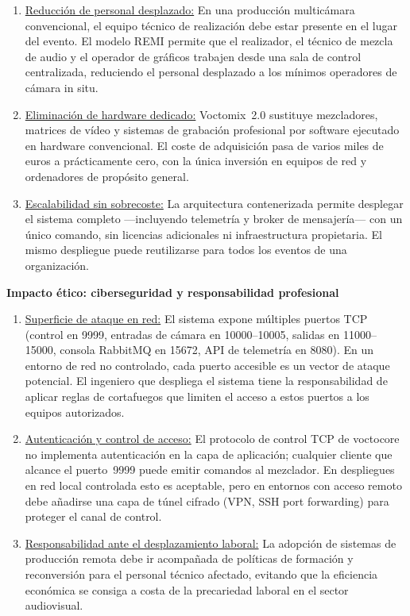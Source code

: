 \begin{enumerate}
  \item \underline{Reducción de personal desplazado:} En una producción multicámara convencional,
  el equipo técnico de realización debe estar presente en el lugar del evento. El modelo REMI
  permite que el realizador, el técnico de mezcla de audio y el operador de gráficos trabajen
  desde una sala de control centralizada, reduciendo el personal desplazado a los mínimos
  operadores de cámara in situ.

  \item \underline{Eliminación de hardware dedicado:} Voctomix~2.0 sustituye mezcladores,
  matrices de vídeo y sistemas de grabación profesional por software ejecutado en hardware
  convencional. El coste de adquisición pasa de varios miles de euros a prácticamente cero,
  con la única inversión en equipos de red y ordenadores de propósito general.

  \item \underline{Escalabilidad sin sobrecoste:} La arquitectura contenerizada permite desplegar
  el sistema completo —incluyendo telemetría y broker de mensajería— con un único comando,
  sin licencias adicionales ni infraestructura propietaria. El mismo despliegue puede reutilizarse
  para todos los eventos de una organización.
\end{enumerate}

\vspace{0.15cm}
\textbf{Impacto ético: ciberseguridad y responsabilidad profesional}

\begin{enumerate}
  \item \underline{Superficie de ataque en red:} El sistema expone múltiples puertos TCP
  (control en 9999, entradas de cámara en 10000--10005, salidas en 11000--15000, consola
  RabbitMQ en 15672, API de telemetría en 8080). En un entorno de red no controlado, cada
  puerto accesible es un vector de ataque potencial. El ingeniero que despliega el sistema
  tiene la responsabilidad de aplicar reglas de cortafuegos que limiten el acceso a estos
  puertos a los equipos autorizados.

  \item \underline{Autenticación y control de acceso:} El protocolo de control TCP de voctocore
  no implementa autenticación en la capa de aplicación; cualquier cliente que alcance el
  puerto~9999 puede emitir comandos al mezclador. En despliegues en red local controlada esto
  es aceptable, pero en entornos con acceso remoto debe añadirse una capa de túnel cifrado
  (VPN, SSH port forwarding) para proteger el canal de control.

  \item \underline{Responsabilidad ante el desplazamiento laboral:} La adopción de sistemas
  de producción remota debe ir acompañada de políticas de formación y reconversión para el
  personal técnico afectado, evitando que la eficiencia económica se consiga a costa de la
  precariedad laboral en el sector audiovisual.
\end{enumerate}

